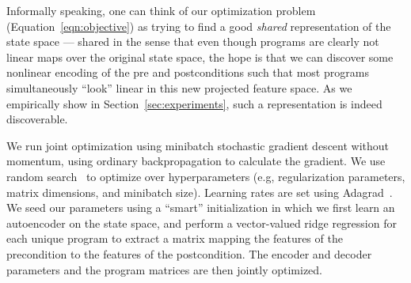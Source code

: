 Informally speaking, one can think of our optimization problem (Equation~\ref{eqn:objective}) as trying to
find a good \emph{shared} representation of the state space ---
shared in the sense that 
even though programs are clearly not linear maps over the
original state space, the hope is that we can discover some 
nonlinear encoding of the pre and postconditions such that most
programs simultaneously 
``look'' linear in this new projected feature space.
As we empirically show in Section~\ref{sec:experiments}, such a representation
is indeed discoverable.

We run joint optimization using minibatch stochastic gradient 
descent without momentum, 
using ordinary backpropagation to calculate the gradient.
We use random search~\cite{bergstra2012random}
to optimize over hyperparameters (e.g, regularization parameters,
matrix dimensions, and minibatch size).
Learning rates are set using Adagrad~\cite{duchi2011adaptive}. We seed our parameters using a ``smart'' initialization 
in which we first learn an
autoencoder on the state space, and perform a vector-valued ridge
regression for each unique program
to extract a matrix mapping the features of the precondition
to the features of the postcondition.  The encoder and decoder parameters and the program matrices are then jointly optimized.







%

